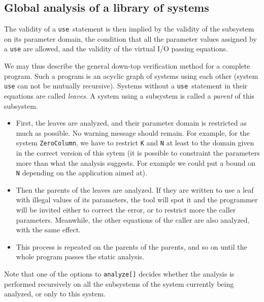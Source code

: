 \subsection{Global analysis of a library of systems}

The validity of a \texttt{use}\ statement is then implied by the
validity of the subsystem on its parameter domain, the condition that
all the parameter values assigned by a \texttt{use} are allowed, and
the validity of the virtual I/O passing equations.

We may thus describe the general down-top verification method for a
complete program. Such a program is an acyclic graph of {\alfa}
systems using each other (system \texttt{use} can not be mutually
recursive). Systems without a \texttt{use}\ statement in their
equations are called {\em leaves}. A system using a subsystem is
called a {\em parent} of this subsystem.
\begin{itemize}
\item First, the leaves are analyzed, and their parameter domain is
restricted as much as possible. No warning message should remain.  For
example, for the system \texttt{ZeroColumn}, we have to restrict
\texttt{K} and \texttt{N} at least to the domain given in the
correct version of this sytem (it is possible to constraint the
parameters more than what the analysis suggests. For example we could
put a bound on \texttt{N} depending on the application aimed at).

\item Then the parents of the leaves are analyzed. If they are written
to use a leaf with illegal values of its parameters, the tool
will spot it and the programmer will be invited either to correct the
error, or to restrict more the caller parameters. Meanwhile, the other
equations of the caller are also analyzed, with the same effect.

\item This process is repeated on the parents of the parents, and so
on until the whole program passes the static analysis.
\end{itemize}

Note that one of the options to \texttt{analyze[]} decides whether the
analysis is performed recursively on all the subsystems of the system
currently being analyzed, or only to this system.
